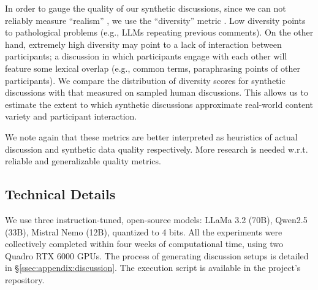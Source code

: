 In order to gauge the quality of our synthetic discussions, since we can not reliably measure ``realism'' \cite{rossi_2024}, we use the ``diversity'' metric \citep{ulmer2024}. Low diversity points to pathological problems (e.g., LLMs repeating previous comments). On the other hand, extremely high diversity may point to a lack of interaction between participants; a discussion in which participants engage with each other will feature some lexical overlap (e.g., common terms, paraphrasing points of other participants). We compare the distribution of diversity scores for synthetic discussions with that measured on sampled human discussions. This allows us to estimate the extent to which synthetic discussions approximate real-world content variety and participant interaction. 

We note again that these metrics are better interpreted as heuristics of actual discussion and synthetic data quality respectively. More research is needed w.r.t. reliable and generalizable quality metrics.


\subsection{Technical Details}
\label{ssec:experimental:setup}

We use three instruction-tuned, open-source models: LLaMa 3.2 (70B), Qwen2.5 (33B),  Mistral Nemo (12B), quantized to 4 bits. All the experiments were collectively completed within four weeks of computational time, using two Quadro RTX 6000 GPUs. The process of generating discussion setups is detailed in \S\ref{ssec:appendix:discussion}. The execution script is available in the project's repository.\analysislink 